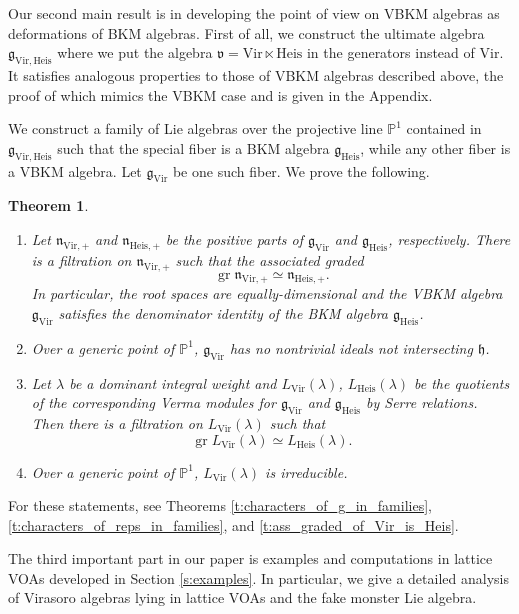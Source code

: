 \documentclass[11pt]{amsart}
\newcommand{\PP}{\mathbb{P}}
\newcommand{\vv}{\mathfrak{v}}
\newcommand{\n}{\mathfrak{n}}
\newcommand{\g}{\mathfrak{g}}
\newcommand{\h}{\mathfrak{h}}
\newcommand{\Vir}{\mathrm{Vir}}
\newcommand{\Heis}{\mathrm{Heis}}
\numberwithin{equation}{section}
\theoremstyle{plain}
\newtheorem{theorem}{Theorem}[section]
\theoremstyle{definition}
\begin{document}
Our second main result is in developing the point of view on VBKM algebras as deformations of BKM algebras. First of all, we construct the ultimate algebra $\g_{\Vir,\Heis}$ where we put the algebra $\vv=\Vir\ltimes\Heis$ in the generators instead of $\Vir$. It satisfies analogous properties to those of VBKM algebras described above, the proof of which mimics the VBKM case and is given in the Appendix. 

We construct a family of Lie algebras over the projective line $\PP^1$ contained in $\g_{\Vir,\Heis}$ such that the special fiber is a BKM algebra $\g_{\Heis}$, while any other fiber is a VBKM algebra.
Let $\g_{\Vir}$ be one such fiber. We prove the following.
\begin{theorem}\,
    \begin{enumerate}[label=(\roman*)]
        \item Let $\n_{\Vir,+}$ and $\n_{\Heis,+}$ be the positive parts of $\g_\Vir$ and $\g_\Heis$, respectively. There is a filtration on $\n_{\Vir,+}$ such that the associated graded
        $$  
        \operatorname{gr}\n_{\Vir,+}\simeq \n_{\Heis,+}.
        $$
        In particular, the root spaces are equally-dimensional and the VBKM algebra $\g_{\Vir}$ satisfies the denominator identity of the BKM algebra $\g_{\Heis}$.
        \item Over a generic point of $\PP^1$, $\g_{\Vir}$ has no nontrivial ideals not intersecting $\h$.
        \item Let $\lambda$ be a dominant integral weight and  $L_\Vir(\lambda)$, $L_\Heis(\lambda)$ be the quotients of the corresponding Verma modules for $\g_{\Vir}$ and $\g_{\Heis}$ by Serre relations. Then there is a filtration on $L_\Vir(\lambda)$ such that
        $$
        \operatorname{gr} L_\Vir(\lambda)\simeq L_\Heis(\lambda).
        $$
        \item Over a generic point of $\PP^1$, $L_\Vir(\lambda)$ is irreducible.
    \end{enumerate}
\end{theorem}

For these statements, see Theorems \ref{t:characters_of_g_in_families}, \ref{t:characters_of_reps_in_families}, and \ref{t:ass_graded_of_Vir_is_Heis}.

The third important part in our paper is examples and computations in lattice VOAs developed in Section \ref{s:examples}. In particular, we give a detailed analysis of Virasoro algebras lying in lattice VOAs and the fake monster Lie algebra.
\end{document}
